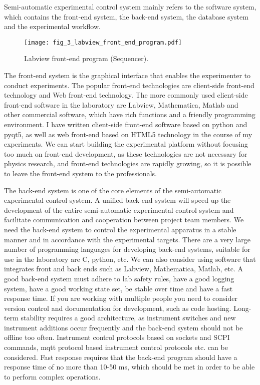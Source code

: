 Semi-automatic experimental control system mainly refers to the software system, which contains the front-end system, the back-end system, the database system and the experimental workflow.

\begin{figure}
    \centering
    \texttt{[image: fig\_3\_labview\_front\_end\_program.pdf]}
    \caption{Labview front-end program (Sequencer).}
\end{figure}

The front-end system is the graphical interface that enables the experimenter to conduct experiments. The popular front-end technologies are client-side front-end technology and Web front-end technology. The more commonly used client-side front-end software in the laboratory are Labview, Mathematica, Matlab and other commercial software, which have rich functions and a friendly programming environment. I have written client-side front-end software based on python and pyqt5, as well as web front-end based on HTML5 technology in the course of my experiments. We can start building the experimental platform without focusing too much on front-end development, as these technologies are not necessary for physics research, and front-end technologies are rapidly growing, so it is possible to leave the front-end system to the professionals.

The back-end system is one of the core elements of the semi-automatic experimental control system. A unified back-end system will speed up the development of the entire semi-automatic experimental control system and facilitate communication and cooperation between project team members. We need the back-end system to control the experimental apparatus in a stable manner and in accordance with the experimental targets. There are a very large number of programming languages for developing back-end systems, suitable for use in the laboratory are C, python, etc. We can also consider using software that integrates front and back ends such as Labview, Mathematica, Matlab, etc. A good back-end system must adhere to lab safety rules, have a good logging system, have a good working state set, be stable over time and have a fast response time. If you are working with multiple people you need to consider version control and documentation for development, such as code hosting. Long-term stability requires a good architecture, as instrument switches and new instrument additions occur frequently and the back-end system should not be offline too often. Instrument control protocols based on sockets and SCPI commands, mqtt protocol based instrument control protocols etc. can be considered. Fast response requires that the back-end program should have a response time of no more than 10-50 ms, which should be met in order to be able to perform complex operations.

